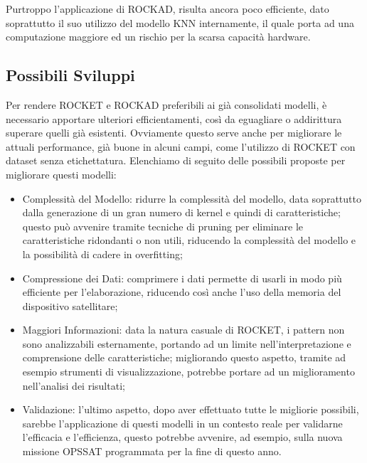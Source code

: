 Purtroppo l'applicazione di ROCKAD, risulta ancora poco efficiente, dato soprattutto il suo utilizzo del modello KNN internamente, il quale porta ad una computazione maggiore ed un rischio per la scarsa capacità hardware.

\subsection{Possibili Sviluppi}
Per rendere ROCKET e ROCKAD preferibili ai già consolidati modelli, è necessario apportare ulteriori efficientamenti, così da eguagliare o addirittura superare quelli già esistenti.
Ovviamente questo serve anche per migliorare le attuali performance, già buone in alcuni campi, come l'utilizzo di ROCKET con dataset senza etichettatura.
Elenchiamo di seguito delle possibili proposte per migliorare questi modelli:
\begin{itemize}
    \item Complessità del Modello: ridurre la complessità del modello, data soprattutto dalla generazione di un gran numero di kernel e quindi di caratteristiche; questo può avvenire tramite tecniche di pruning per eliminare le caratteristiche ridondanti o non utili, riducendo la complessità del modello e la possibilità di cadere in overfitting;
    \item Compressione dei Dati: comprimere i dati permette di usarli in modo più efficiente per l'elaborazione, riducendo così anche l'uso della memoria del dispositivo satellitare;
    \item Maggiori Informazioni: data la natura casuale di ROCKET, i pattern non sono analizzabili esternamente, portando ad un limite nell'interpretazione e comprensione delle caratteristiche; migliorando questo aspetto, tramite ad esempio strumenti di visualizzazione, potrebbe portare ad un miglioramento nell'analisi dei risultati;
    \item Validazione: l'ultimo aspetto, dopo aver effettuato tutte le migliorie possibili, sarebbe l'applicazione di questi modelli in un contesto reale per validarne l'efficacia e l'efficienza, questo potrebbe avvenire, ad esempio, sulla nuova missione OPS\textunderscore SAT programmata per la fine di questo anno.
\end{itemize}
